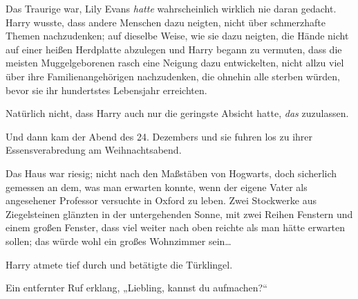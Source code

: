 Das Traurige war, Lily Evans \emph{hatte} wahrscheinlich wirklich nie daran gedacht. Harry wusste, dass andere Menschen dazu neigten, nicht über schmerzhafte Themen nachzudenken; auf dieselbe Weise, wie sie dazu neigten, die Hände nicht auf einer heißen Herdplatte abzulegen und Harry begann zu vermuten, dass die meisten Muggelgeborenen rasch eine Neigung dazu entwickelten, nicht allzu viel über ihre Familienangehörigen nachzudenken, die ohnehin alle sterben würden, bevor sie ihr hundertstes Lebensjahr erreichten.

Natürlich nicht, dass Harry auch nur die geringste Absicht hatte, \emph{das} zuzulassen.

Und dann kam der Abend des 24. Dezembers und sie fuhren los zu ihrer Essensverabredung am Weihnachtsabend.

\later

Das Haus war riesig; nicht nach den Maßstäben von Hogwarts, doch sicherlich gemessen an dem, was man erwarten konnte, wenn der eigene Vater als angesehener Professor versuchte in Oxford zu leben. Zwei Stockwerke aus Ziegelsteinen glänzten in der untergehenden Sonne, mit zwei Reihen Fenstern und einem großen Fenster, dass viel weiter nach oben reichte als man hätte erwarten sollen; das würde wohl ein großes Wohnzimmer sein…

Harry atmete tief durch und betätigte die Türklingel.

Ein entfernter Ruf erklang, „Liebling, kannst du aufmachen?“


